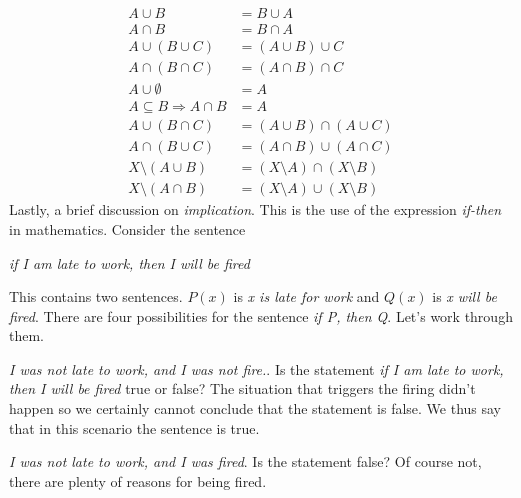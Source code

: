 \documentclass{article}
\theoremstyle{plain}
\theoremstyle{normal}
\begin{document}
        \begin{align}
            A\cup{B}&=B\cup{A}\tag{Commutativity of Unions}\\
            A\cap{B}&=B\cap{A}\tag{Commutativity of Intersections}\\
            A\cup(B\cup{C})&=(A\cup{B})\cup{C}\tag{Associativity of Unions}\\
            A\cap(B\cap{C})&=(A\cap{B})\cap{C}\tag{Associativity of Intersections}\\
            A\cup\emptyset&=A\tag{Identity Law of Unions}\\
            A\subseteq{B}\Rightarrow{A}\cap{B}&=A\tag{Identity Law of Intersections}\\
            A\cup(B\cap{C})&=(A\cup{B})\cap(A\cup{C})\tag{Distributive Law of Unions}\\
            A\cap(B\cup{C})&=(A\cap{B})\cup(A\cap{C})\tag{Distributive Law of Intersections}\\
            X\setminus(A\cup{B})&=(X\setminus{A})\cap(X\setminus{B})\tag{De Morgan's Law of Unions}\\
            X\setminus(A\cap{B})&=(X\setminus{A})\cup(X\setminus{B})\tag{De Morgan's Law of Intersections}
        \end{align}
        Lastly, a brief discussion on \textit{implication}. This is the use
        of the expression \textit{if-then} in mathematics. Consider the sentence
            \begin{center}
                \textit{if I am late to work, then I will be fired}
            \end{center}
            This contains two sentences. $P(x)$ is \textit{x is late for work}
            and $Q(x)$ is \textit{x will be fired}. There are four possibilities
            for the sentence \textit{if P, then Q}. Let's work through them.
            \par\hfill\par
            \textit{I was not late to work, and I was not fire.}. Is the
            statement \textit{if I am late to work, then I will be fired}
            true or false? The situation that triggers the firing didn't happen
            so we certainly cannot conclude that the statement is false. We
            thus say that in this scenario the sentence is true.
            \par\hfill\par
            \textit{I was not late to work, and I was fired}. Is the statement
            false? Of course not, there are plenty of reasons for being fired.
\end{document}
